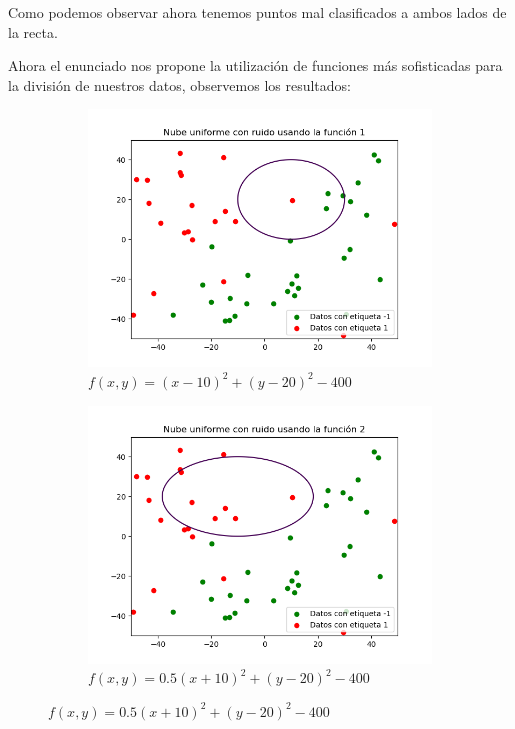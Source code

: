 \documentclass[12pt,a4paper]{article}
\begin{document}
Como podemos observar ahora tenemos puntos mal clasificados a ambos lados de la recta.

Ahora el enunciado nos propone la utilización de funciones más sofisticadas para la división de nuestros datos, observemos los resultados:

\begin{figure}[H]
	\centering
	\begin{subfigure}{0.49\textwidth}
		\includegraphics[scale=0.55]{./Imagenes/ej1-5.png}
		\caption{$f(x,y) = (x-10)^2 + (y-20)^2 - 400$}
	\end{subfigure}
	\begin{subfigure}{0.49\textwidth}
		\includegraphics[scale=0.55]{./Imagenes/ej1-6.png}
		\caption{$f(x,y) = 0.5(x+10)^2 + (y-20)^2 - 400$}
	\end{subfigure}
\end{figure}
\end{document}
